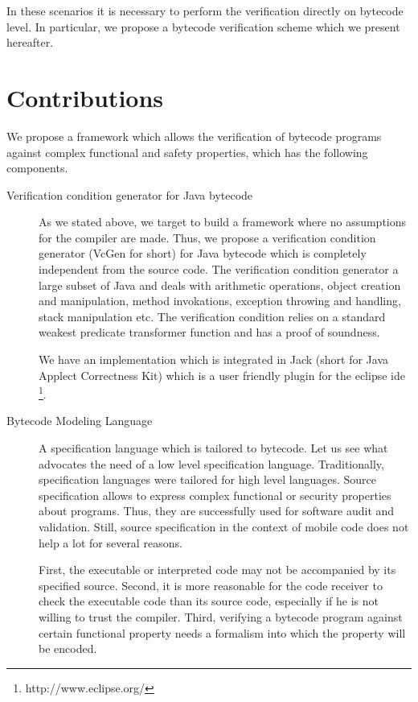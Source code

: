 In these scenarios it is necessary to perform the verification  directly on bytecode level. In particular, we propose a bytecode
 verification  scheme which we present hereafter.

   \section{Contributions}
We propose a framework which allows the verification of bytecode programs against complex functional and safety properties, which has the following 
components.
\begin{description}
   \item [Verification condition generator for Java bytecode]
         As we stated above, we target to build a framework where no assumptions for the compiler are made.
	 Thus, we propose a verification condition generator (VcGen for short) for Java bytecode which is completely independent from 
	 the source code. The verification condition generator a large subset of Java and deals with
	 arithmetic operations, object creation and manipulation,
	 method invokations, exception throwing and handling, stack manipulation etc.
	 The verification condition relies on a standard weakest predicate transformer function
	 and  has a proof of soundness.
	 
	 We have an implementation which is integrated in Jack (short for Java Applect Correctness Kit) \cite{BRL-JACK} which is a user friendly 
	 plugin for the eclipse ide \footnote{http://www.eclipse.org/}. 
	 
   \item [Bytecode Modeling Language] 
         A specification language which is tailored to bytecode. Let us see what advocates the need of a
	 low level specification language. Traditionally, specification languages were tailored for high level languages.  
	 Source  specification allows to express complex functional or security properties about programs.
	 Thus, they are successfully  used for software audit and validation. Still, source specification in 
	 the context of mobile code does not help a lot for several reasons.


	 First, the executable or interpreted code  may not be accompanied by its specified  source. Second, it is more reasonable for the 
	 code receiver to check the executable code than its source code, especially if he is not willing to trust the compiler.
	 Third, verifying a bytecode program against certain functional property needs a formalism into which the property will be encoded. 



\end{description}
